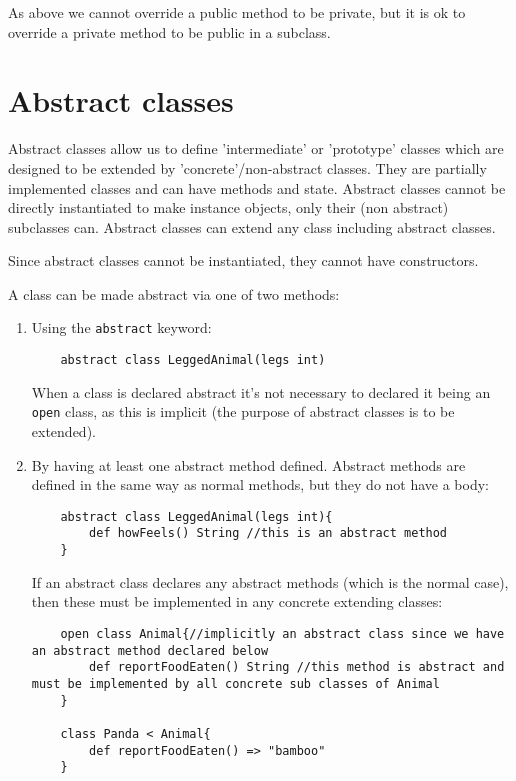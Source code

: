 \documentclass[conc-doc]{subfiles}
\begin{document}
As above we cannot override a public method to be private, but it is ok to override a private method to be public in a subclass.


\section{Abstract classes}
Abstract classes allow us to define 'intermediate' or 'prototype' classes which are designed to be extended by 'concrete'/non-abstract classes. They are partially implemented classes and can have methods and state. Abstract classes cannot be directly instantiated to make instance objects, only their (non abstract) subclasses can. Abstract classes can extend any class including abstract classes.

Since abstract classes cannot be instantiated, they cannot have constructors. 

A class can be made abstract via one of two methods:
\begin{enumerate}
	\item Using the \lstinline{abstract} keyword:
	\begin{lstlisting}
	abstract class LeggedAnimal(legs int)
	\end{lstlisting}

	When a class is declared abstract it's not necessary to declared it being an \lstinline{open} class, as this is implicit (the purpose of abstract classes is to be extended).

	\item By having at least one abstract method defined. Abstract methods are defined in the same way as normal methods, but they do not have a body:
	\begin{lstlisting}
	abstract class LeggedAnimal(legs int){
		def howFeels() String //this is an abstract method
	}
	\end{lstlisting}
	
	If an abstract class declares any abstract methods (which is the normal case), then these must be implemented in any concrete extending classes:
	
	\begin{lstlisting}
	open class Animal{//implicitly an abstract class since we have an abstract method declared below
		def reportFoodEaten() String //this method is abstract and must be implemented by all concrete sub classes of Animal
	}
	
	class Panda < Animal{
		def reportFoodEaten() => "bamboo"
	}
	\end{lstlisting}
\end{enumerate}
\end{document}
